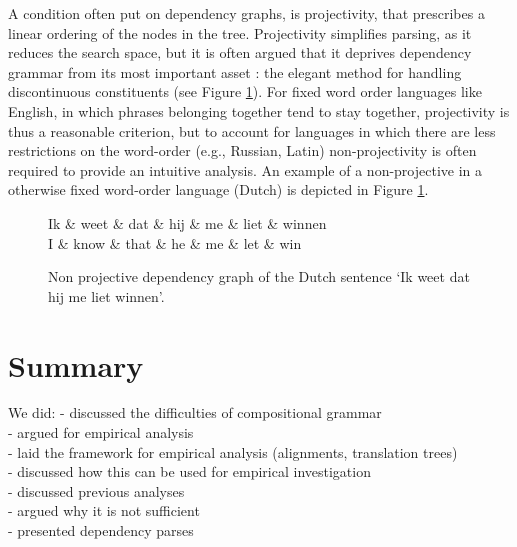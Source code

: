 \documentclass{report}
\begin{document}
A condition often put on dependency graphs, is projectivity, that prescribes a linear ordering of the nodes in the tree. Projectivity simplifies parsing, as it reduces the search space, but it is often argued that it deprives dependency grammar from its most important asset \citep{covington1990dependency,debusmann2000introduction}: the elegant method for handling discontinuous constituents (see Figure \ref{fig:npdeptree}). For fixed word order languages like English, in which phrases belonging together tend to stay together, projectivity is thus a reasonable criterion, but to account for languages in which there are less restrictions on the word-order (e.g., Russian, Latin) non-projectivity is often required to provide an intuitive analysis. An example of a non-projective in a otherwise fixed word-order language (Dutch) is depicted in Figure \ref{fig:npdeptree}.

\begin{figure}[!ht]
\centering
\begin{dependency}[theme=simple]%
\begin{deptext}[column sep=.5cm, row sep=.1ex]
Ik \& weet \& dat \& hij \& me \& liet \& winnen\\
\tiny{I} \& \tiny{know} \& \tiny{that} \& \tiny{he} \& \tiny{me} \& \tiny{let} \& \tiny{win}\\
\end{deptext}
\end{dependency}
\caption{Non projective dependency graph of the Dutch sentence `Ik weet dat hij me liet winnen'.}\label{fig:npdeptree}
\end{figure}

\section{Summary}

We did:
- discussed the difficulties of compositional grammar\\
- argued for empirical analysis\\
- laid the framework for empirical analysis (alignments, translation trees)\\
- discussed how this can be used for empirical investigation\\
- discussed previous analyses\\
- argued why it is not sufficient\\
- presented dependency parses



\end{document}
